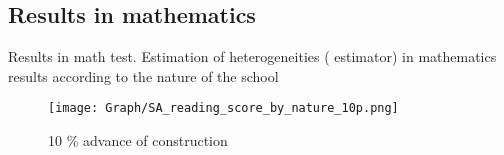 \documentclass[9pt]{beamer}
\begin{document}
\subsection{Results in mathematics}

\begin{frame}{ Results in math test.  \hyperlink{result_math}{} }\label{10p_math_nat}
\small Estimation of heterogeneities (\cite{SUN2021175} estimator) in mathematics results according to the nature of the school  
\begin{figure}
  \centering
  \texttt{[image: Graph/SA\_reading\_score\_by\_nature\_10p.png]} 
  \caption{\small 10 \% advance of construction}
  \label{fig:6.1sub-first}
\end{figure}
\end{frame}
\end{document}
